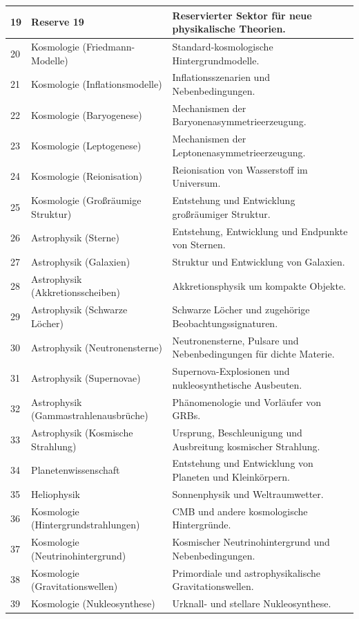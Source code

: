 \documentclass[13pt,a4paper]{article}
\begin{document}
\begin{longtable}{|p{0.9cm}|p{6.0cm}|p{8.6cm}|}
		\hline
		19 & Reserve 19 & Reservierter Sektor für neue physikalische Theorien. \\
		\hline
		20 & Kosmologie (Friedmann-Modelle) & Standard-kosmologische Hintergrundmodelle. \\
		\hline
		21 & Kosmologie (Inflationsmodelle) & Inflationsszenarien und Nebenbedingungen. \\
		\hline
		22 & Kosmologie (Baryogenese) & Mechanismen der Baryonenasymmetrieerzeugung. \\
		\hline
		23 & Kosmologie (Leptogenese) & Mechanismen der Leptonenasymmetrieerzeugung. \\
		\hline
		24 & Kosmologie (Reionisation) & Reionisation von Wasserstoff im Universum. \\
		\hline
		25 & Kosmologie (Großräumige Struktur) & Entstehung und Entwicklung großräumiger Struktur. \\
		\hline
		26 & Astrophysik (Sterne) & Entstehung, Entwicklung und Endpunkte von Sternen. \\
		\hline
		27 & Astrophysik (Galaxien) & Struktur und Entwicklung von Galaxien. \\
		\hline
		28 & Astrophysik (Akkretionsscheiben) & Akkretionsphysik um kompakte Objekte. \\
		\hline
		29 & Astrophysik (Schwarze Löcher) & Schwarze Löcher und zugehörige Beobachtungssignaturen. \\
		\hline
		30 & Astrophysik (Neutronensterne) & Neutronensterne, Pulsare und Nebenbedingungen für dichte Materie. \\
		\hline
		31 & Astrophysik (Supernovae) & Supernova-Explosionen und nukleosynthetische Ausbeuten. \\
		\hline
		32 & Astrophysik (Gammastrahlenausbrüche) & Phänomenologie und Vorläufer von GRBs. \\
		\hline
		33 & Astrophysik (Kosmische Strahlung) & Ursprung, Beschleunigung und Ausbreitung kosmischer Strahlung. \\
		\hline
		34 & Planetenwissenschaft & Entstehung und Entwicklung von Planeten und Kleinkörpern. \\
		\hline
		35 & Heliophysik & Sonnenphysik und Weltraumwetter. \\
		\hline
		36 & Kosmologie (Hintergrundstrahlungen) & CMB und andere kosmologische Hintergründe. \\
		\hline
		37 & Kosmologie (Neutrinohintergrund) & Kosmischer Neutrinohintergrund und Nebenbedingungen. \\
		\hline
		38 & Kosmologie (Gravitationswellen) & Primordiale und astrophysikalische Gravitationswellen. \\
		\hline
		39 & Kosmologie (Nukleosynthese) & Urknall- und stellare Nukleosynthese. \\
		\hline
	\end{longtable}
	
\end{document}
